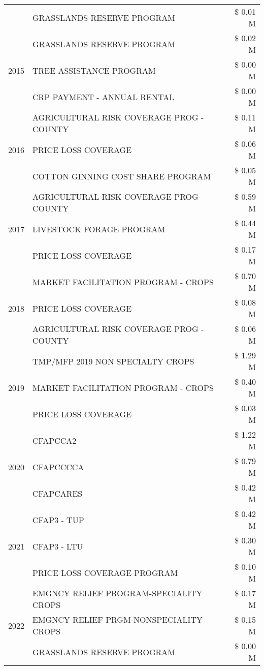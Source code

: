 \begin{tabular}{llr}
 & GRASSLANDS RESERVE PROGRAM & \$ 0.01 M \\
\cline{1-3}
\multirow[t]{3}{*}{2015} & GRASSLANDS RESERVE PROGRAM & \$ 0.02 M \\
 & TREE ASSISTANCE PROGRAM & \$ 0.00 M \\
 & CRP PAYMENT - ANNUAL RENTAL & \$ 0.00 M \\
\cline{1-3}
\multirow[t]{3}{*}{2016} & AGRICULTURAL RISK COVERAGE PROG - COUNTY & \$ 0.11 M \\
 & PRICE LOSS COVERAGE & \$ 0.06 M \\
 & COTTON GINNING COST SHARE PROGRAM & \$ 0.05 M \\
\cline{1-3}
\multirow[t]{3}{*}{2017} & AGRICULTURAL RISK COVERAGE PROG - COUNTY & \$ 0.59 M \\
 & LIVESTOCK FORAGE PROGRAM & \$ 0.44 M \\
 & PRICE LOSS COVERAGE & \$ 0.17 M \\
\cline{1-3}
\multirow[t]{3}{*}{2018} & MARKET FACILITATION PROGRAM - CROPS & \$ 0.70 M \\
 & PRICE LOSS COVERAGE & \$ 0.08 M \\
 & AGRICULTURAL RISK COVERAGE PROG - COUNTY & \$ 0.06 M \\
\cline{1-3}
\multirow[t]{3}{*}{2019} & TMP/MFP 2019 NON SPECIALTY CROPS & \$ 1.29 M \\
 & MARKET FACILITATION PROGRAM - CROPS & \$ 0.40 M \\
 & PRICE LOSS COVERAGE & \$ 0.03 M \\
\cline{1-3}
\multirow[t]{3}{*}{2020} & CFAPCCA2 & \$ 1.22 M \\
 & CFAPCCCCA & \$ 0.79 M \\
 & CFAPCARES & \$ 0.42 M \\
\cline{1-3}
\multirow[t]{3}{*}{2021} & CFAP3 - TUP & \$ 0.42 M \\
 & CFAP3 - LTU & \$ 0.30 M \\
 & PRICE LOSS COVERAGE PROGRAM & \$ 0.10 M \\
\cline{1-3}
\multirow[t]{3}{*}{2022} & EMGNCY RELIEF PROGRAM-SPECIALITY CROPS & \$ 0.17 M \\
 & EMGNCY RELIEF PRGM-NONSPECIALITY CROPS & \$ 0.15 M \\
 & GRASSLANDS RESERVE PROGRAM & \$ 0.00 M \\
\cline{1-3}
\bottomrule
\end{tabular}
